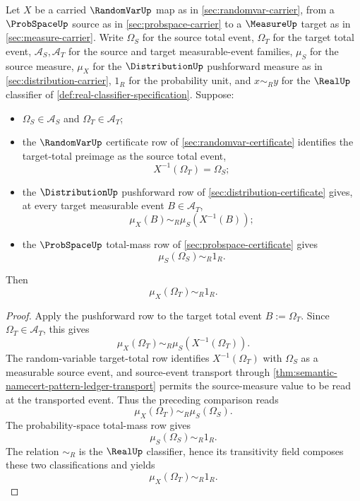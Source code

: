 \begin{theorem}
\label{thm:distribution-pushforward-total-mass-unit}
Let $X$ be a carried $\RandomVarUp$ map as in \autoref{sec:randomvar-carrier}, from a $\ProbSpaceUp$ source as in \autoref{sec:probspace-carrier} to a $\MeasureUp$ target as in \autoref{sec:measure-carrier}. Write $\Omega_S$ for the source total event, $\Omega_T$ for the target total event, $\mathcal{A}_S,\mathcal{A}_T$ for the source and target measurable-event families, $\mu_S$ for the source measure, $\mu_X$ for the $\DistributionUp$ pushforward measure as in \autoref{sec:distribution-carrier}, $1_R$ for the probability unit, and $x\sim_R y$ for the $\RealUp$ classifier of \autoref{def:real-classifier-specification}. Suppose:
\begin{itemize}
\item $\Omega_S\in\mathcal{A}_S$ and $\Omega_T\in\mathcal{A}_T$;
\item the $\RandomVarUp$ certificate row of \autoref{sec:randomvar-certificate} identifies the target-total preimage as the source total event,
$$
X^{-1}(\Omega_T)=\Omega_S;
$$
\item the $\DistributionUp$ pushforward row of \autoref{sec:distribution-certificate} gives, at every target measurable event $B\in\mathcal{A}_T$,
$$
\mu_X(B)\sim_R\mu_S(X^{-1}(B));
$$
\item the $\ProbSpaceUp$ total-mass row of \autoref{sec:probspace-certificate} gives
$$
\mu_S(\Omega_S)\sim_R1_R.
$$
\end{itemize}
Then
$$
\mu_X(\Omega_T)\sim_R1_R.
$$
\end{theorem}
\begin{proof}
Apply the pushforward row to the target total event $B:=\Omega_T$. Since $\Omega_T\in\mathcal{A}_T$, this gives
$$
\mu_X(\Omega_T)\sim_R\mu_S(X^{-1}(\Omega_T)).
$$
The random-variable target-total row identifies $X^{-1}(\Omega_T)$ with $\Omega_S$ as a measurable source event, and source-event transport through \autoref{thm:semantic-namecert-pattern-ledger-transport} permits the source-measure value to be read at the transported event. Thus the preceding comparison reads
$$
\mu_X(\Omega_T)\sim_R\mu_S(\Omega_S).
$$
The probability-space total-mass row gives
$$
\mu_S(\Omega_S)\sim_R1_R.
$$
The relation $\sim_R$ is the $\RealUp$ classifier, hence its transitivity field composes these two classifications and yields
$$
\mu_X(\Omega_T)\sim_R1_R.
$$
\end{proof}

